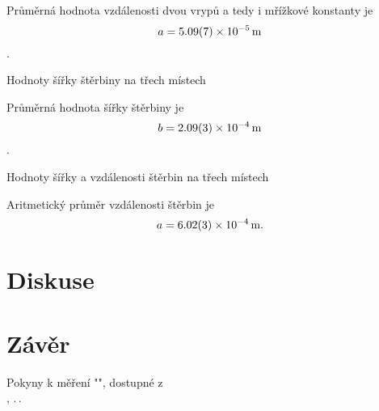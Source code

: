 \documentclass{protokol}
\begin{document}
      Průměrná hodnota vzdálenosti dvou vrypů a tedy i mřížkové konstanty je $$ a = \SI{5.09 \pm 0.07 e-5}{m}$$.
      
      \begin{table}[H]
        \centering
        \setlength{\tabcolsep}{5pt}
        
        \caption{Hodnoty šířky štěrbiny na třech místech}
        \label{tab:sterbina_stredni}
      \end{table}

      Průměrná hodnota šířky štěrbiny je $$ b = \SI{2.09 \pm 0.03 e-4}{m}$$.
      
      \begin{table}[H]
        \centering
        \setlength{\tabcolsep}{10pt}
        
        \caption{Hodnoty šířky a vzdálenosti štěrbin na třech místech}
        \label{tab:dvojs_blizke}
      \end{table}

      Aritmetický průměr vzdálenosti štěrbin je 
      $$ a = \SI{6.02 \pm 0.03 e-4}{m}. $$


  \section*{Diskuse}

  \section*{Závěr}

  \begin{thebibliography}{}

    Pokyny k měření "", dostupné z\\ \url{}, .\,.\,
  
  \end{thebibliography}
\end{document}
